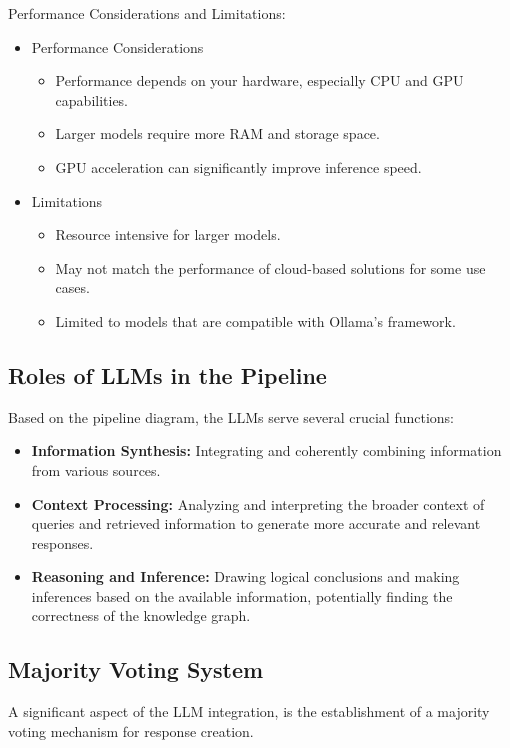 Performance Considerations and Limitations:
\begin{itemize}
    \item Performance Considerations
    \begin{itemize}
        \item Performance depends on your hardware, especially CPU and GPU capabilities.
        \item Larger models require more RAM and storage space.
        \item GPU acceleration can significantly improve inference speed.
    \end{itemize}
    \item Limitations
    \begin{itemize}
        \item Resource intensive for larger models.
        \item May not match the performance of cloud-based solutions for some use cases.
        \item Limited to models that are compatible with Ollama's framework.
    \end{itemize}
\end{itemize}

\subsection{Roles of LLMs in the Pipeline}\label{subsec:roles-of-llms-in-the-pipeline}
Based on the pipeline diagram, the LLMs serve several crucial functions:
\begin{itemize}
    \item \textbf{Information Synthesis:} Integrating and coherently combining information from various sources.
    \item \textbf{Context Processing:} Analyzing and interpreting the broader context of queries and retrieved information to generate more accurate and relevant responses.
    \item \textbf{Reasoning and Inference:} Drawing logical conclusions and making inferences based on the available information, potentially finding the correctness of the knowledge graph.
\end{itemize}

\subsection{Majority Voting System}\label{subsec:majority-voting-system}
A significant aspect of the LLM integration, is the establishment of a majority voting mechanism for response creation.

